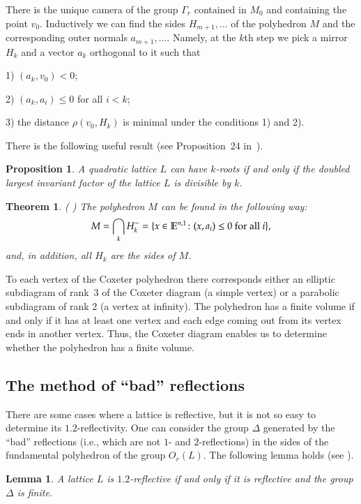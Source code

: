 \documentclass[14pt]{article}
\newtheorem{theorem}{\indent Theorem}[section]
\newtheorem{lemma}{\indent Lemma}[section]
\newtheorem{proposition}{\indent Proposition}[section]
\begin{document}
There is the unique camera of the group  $\Gamma_r$ contained in $M_0$ and
containing the point $v_0$. Inductively we can find the sides $H_{m+1}, \ldots$ of the
polyhedron $M$  and the corresponding outer normals $a_{m+1}, \ldots$.
Namely, at the $k$th step we pick a mirror $H_k$
and a vector $a_k$ orthogonal to it  such that

1) $(a_k, v_0) < 0$;

2) $(a_k, a_i) \le 0$ for all $i < k$;

3) the distance $\rho(v_0, H_k)$ is minimal under the conditions 1) and 2).

There is the following useful result (see
 Proposition~24 in~\cite{vinberg84abskr}).

\begin{proposition}
A quadratic lattice $L$ can have $k$-roots if and only if the
doubled largest invariant factor of the lattice $L$ is divisible by $k$.
\end{proposition}


\begin{theorem} ( \cite{vinberg73descrgr})
The polyhedron  $M$ can be found in the following way:
$$
M = \bigcap \limits_k H_k^- = \{x \in \mathbb{E}^{n,1}\colon (x, a_i)
\le 0 \ \hbox{for all} \ i\},
$$
and, in addition, all $H_k$ are the sides of $M$.
\end{theorem}

To each vertex of the Coxeter polyhedron there corresponds either
an elliptic subdiagram
of rank~$3$
of the Coxeter diagram
(a simple vertex) or a parabolic subdiagram of rank $2$
(a vertex at infinity).
The polyhedron  has a finite volume  if and only if it has at least
one vertex and each edge coming out from its vertex ends in another vertex.
Thus,  the Coxeter diagram enables us to determine whether the polyhedron
has a finite volume.

\subsection{The method of ``bad'' reflections}

There are some cases where a lattice is reflective, but it is not so easy
to determine its $1.2$-reflectivity.
One can consider the group $\Delta$ generated by the ``bad'' reflections
(i.e., which are not $1$- and $2$-reflections)
 in the sides of the fundamental polyhedron of the group $O_r (L)$.
The following lemma holds (see \cite{vinberg07classhyplat}).

\begin{lemma}
A lattice $L$ is $1.2$-reflective if and only if
it is reflective and the group
$\Delta$ is finite.
\end{lemma}
\end{document}

